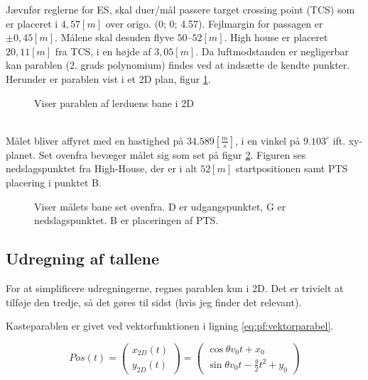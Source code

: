 Jævnfør reglerne for ES, skal duer/mål passere target crossing point (TCS) som er 
placeret i $4,57 [m]$ over origo. (0; 0; 4.57). Fejlmargin for passagen er $\pm0,45 [m]$. 
Målene skal desuden flyve $50 – 52 [m]$.  High house er placeret $20,11 [m]$ fra TCS, i en 
højde af $3,05 [m]$. Da luftmodstanden er negligerbar kan parablen (2. grads 
polynomium) findes ved at indsætte de kendte punkter. Herunder er parablen vist i et 
2D plan, figur \ref{fig:HH2D_para}.
\begin{figure}[!th]
\centering
\begin{tikzpicture}[scale=1]

\end{tikzpicture}
\caption[Lerdue parabel]{Viser parablen af lerduens bane i 2D}
\label{fig:HH2D_para}
\end{figure}
~\\[10pt]
Målet bliver affyret med en hastighed på $34.589 [\frac{m}{s}]$, i en vinkel på $9.103^{\circ}$ ift. xy-
planet. Set ovenfra bevæger målet sig som set på figur \ref{fig:para_in_xy_plane}. 
Figuren ses nedslagspunktet fra High-House, der er i alt $52 [m]$ startpositionen samt 
PTS placering i punktet B. 



\begin{figure}[!th]
\centering
\begin{tikzpicture}[scale=0.2]

\end{tikzpicture}
\caption[tekst i indholdsfortegnelsen]{Viser målets bane set ovenfra. D er udgangspunktet, G er nedslagspunktet. B er placeringen af PTS.}
\label{fig:para_in_xy_plane}
\end{figure}

\subsection{Udregning af tallene}

For at simplificere udregningerne, regnes parablen kun i 2D. Det er trivielt at tilføje den tredje, så det gøres til sidst (hvis jeg finder det relevant). 

Kasteparablen er givet ved vektorfunktionen i ligning  \ref{eq:pf:vektorparabel}.

\begin{equation}
	Pos(t) = \left( \begin{array}{c}
	x_{2D}(t) \\
	y_{2D}(t)
	\end{array}
	\right)
	= \left( \begin{array}{c}
	\cos \theta v_0 t + x_0 \\
	\sin \theta v_0 t - \frac{g}{2} t^2 + y_0
	\end{array}
	\right)
\label{eq:pf:vektorparabel}
\end{equation}

